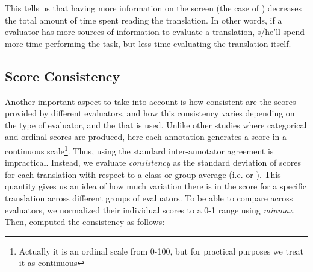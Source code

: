 This tells us that having more information on the screen (the case of \srctgt) decreases the total amount of time spent reading the translation. In other words, if a evaluator has more sources of information to evaluate a translation, s/he'll spend more time performing the task, but less time evaluating the translation itself. 


\vspace{3pt}
\subsection{Score Consistency} 
Another important aspect to take into account is how consistent are the scores provided by different evaluators, and how this consistency varies depending on the type of evaluator, and the \gamet that is used. Unlike other studies where categorical and ordinal scores are produced, here each annotation generates a score in a continuous scale\footnote{Actually it is an ordinal scale from 0-100, but for practical purposes we treat it as continuous}. Thus, using the standard inter-annotator agreement is impractical. Instead, we evaluate \emph{consistency} as the standard deviation of scores for each translation with respect to a class or group average (i.e. \mono or \bil). This quantity gives us an idea of how much variation there is in the score for a specific translation across different groups of evaluators. To be able to compare across evaluators, we  normalized their individual scores to a 0-1 range using \emph{minmax}. Then, computed the consistency as follows:

